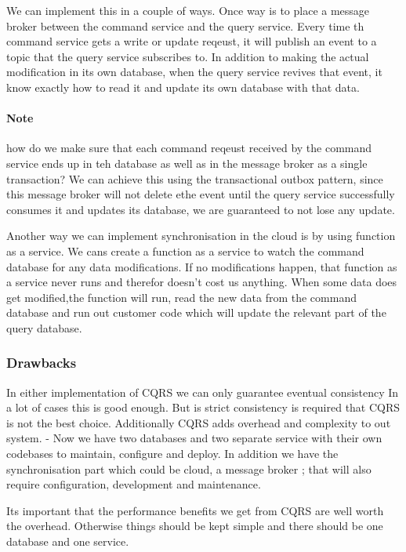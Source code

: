 \documentclass[a4paper, 11pt]{book}
\begin{document}
    We can implement this in a couple of ways.
    Once way is to place a message broker between the command service and the query service.
    Every time th command service gets a write or update reqeust, it will publish an event to a topic that the query service subscribes to.
    In addition to making the actual modification in its own database, when the query service revives that event, it know exactly how to read it and update its own database with that data.

    \paragraph{Note}
    how do we make sure that each command reqeust received by the command service ends up in teh database as well as in the message broker as a single transaction?
    We can achieve this using the transactional outbox pattern, since this message broker will not delete ethe event until the query service successfully consumes it and updates its database, we are guaranteed to not lose any update.

    Another way we can implement synchronisation in the cloud is by using function as a service.
    We cans create a function as a service to watch the command database for any data modifications.
    If no modifications happen, that function as a service never runs and therefor doesn't cost us anything.
    When some data does get modified,the function will run, read the new data from the command database and run out customer code which will update the relevant part of the query database.

    \subsubsection{Drawbacks}
    In either implementation of CQRS we can only guarantee eventual consistency
    In a lot of cases this is good enough.
    But is strict consistency is required that CQRS is not the best choice.
    Additionally CQRS adds overhead and complexity to out system.
    - Now we have two databases and two separate service with their own codebases to maintain, configure and deploy.
    In addition we have the synchronisation part which could be cloud, a message broker ; that will also require configuration, development and maintenance.

    Its important that the performance benefits we get from CQRS are well worth the overhead.
    Otherwise things should be kept simple and there should be one database and one service.
\end{document}
